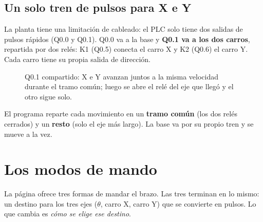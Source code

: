 \documentclass[a4paper,11pt]{article}
\begin{document}
\subsection{Un solo tren de pulsos para X e Y}
La planta tiene una limitación de cableado: el PLC solo tiene dos salidas de pulsos rápidos (Q0.0 y Q0.1). Q0.0 va a la base y \textbf{Q0.1 va a los dos carros}, repartida por dos relés: K1 (Q0.5) conecta el carro X y K2 (Q0.6) el carro Y. Cada carro tiene su propia salida de dirección.

\begin{figure}[H]
\centering
{}
\caption{Q0.1 compartido: X e Y avanzan juntos a la misma velocidad durante el tramo común; luego se abre el relé del eje que llegó y el otro sigue solo.}
\end{figure}

El programa reparte cada movimiento en un \textbf{tramo común} (los dos relés cerrados) y un \textbf{resto} (solo el eje más largo). La base va por su propio tren y se mueve a la vez.

\section{Los modos de mando}

La página ofrece tres formas de mandar el brazo. Las tres terminan en lo mismo: un destino para los tres ejes ($\theta$, carro X, carro Y) que se convierte en pulsos. Lo que cambia es \emph{cómo se elige ese destino}.
\end{document}
